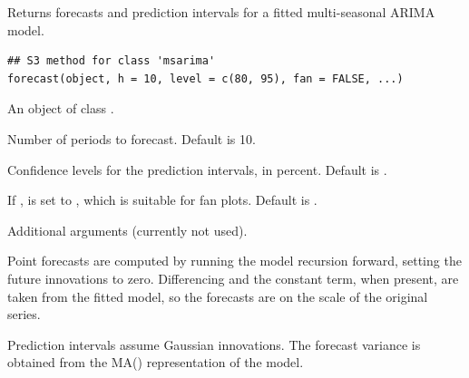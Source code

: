 \documentclass[a4paper]{book}
\begin{document}
%
\begin{Description}
Returns forecasts and prediction intervals for a fitted multi-seasonal ARIMA model.
\end{Description}
%
\begin{Usage}
\begin{verbatim}
## S3 method for class 'msarima'
forecast(object, h = 10, level = c(80, 95), fan = FALSE, ...)
\end{verbatim}
\end{Usage}
%
\begin{Arguments}
\begin{ldescription}
\item[\code{object}] An object of class .

\item[\code{h}] Number of periods to forecast. Default is 10.

\item[\code{level}] Confidence levels for the prediction intervals, in percent.
Default is .

\item[\code{fan}] If ,  is set to ,
which is suitable for fan plots. Default is .

\item[\code{...}] Additional arguments (currently not used).
\end{ldescription}
\end{Arguments}
%
\begin{Details}
Point forecasts are computed by running the model recursion forward, setting the
future innovations to zero. Differencing and the constant term, when present, are
taken from the fitted model, so the forecasts are on the scale of the original
series.

Prediction intervals assume Gaussian innovations. The forecast variance
 is obtained from the MA(\eqn{\infty}{}) representation of the model.
\end{Details}
%
\end{document}
